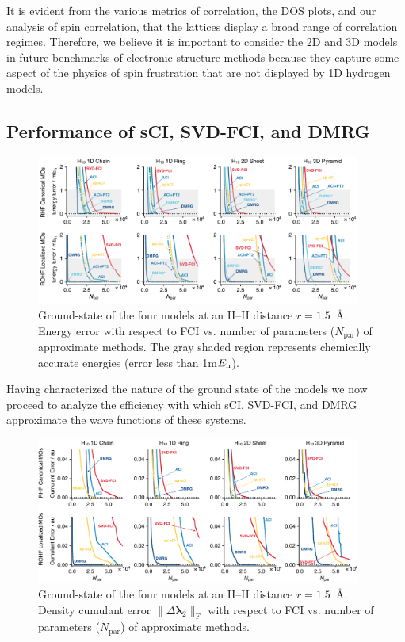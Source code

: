 \documentclass[aip,jcp,amsmath,amssymb, reprint]{revtex4-1}
\newcommand*{\Eh}{$E_{\rm h}$\xspace}
\providecommand{\norm}[1]{\lVert#1\rVert}
\begin{document}
It is evident from the various metrics of correlation, the DOS plots, and our analysis of spin correlation, that the  lattices display a broad range of correlation regimes.
Therefore, we believe it is important to consider the 2D and 3D models in future benchmarks of electronic structure methods because they capture some aspect of the physics of spin frustration that are not displayed by 1D hydrogen models.

\subsection{\label{H10compression} Performance of sCI, SVD-FCI, and DMRG}
\begin{figure}[ht]
\centering
\includegraphics[width=0.95\textwidth]{figure_4.pdf}
\caption{Ground-state of the four  models at an H--H distance $r = 1.5$~{\AA}. Energy error with respect to FCI vs. number of parameters ($N_\mathrm{par}$) of approximate methods. The gray shaded region represents chemically accurate energies (error less than 1m\Eh). }
\label{fig:h10compression_energy}
\end{figure}

Having characterized the nature of the ground state of the  models we now proceed to analyze the efficiency with which sCI, SVD-FCI, and DMRG approximate the wave functions of these systems. 

\begin{figure}[ht]
\centering
\includegraphics[width=0.95\textwidth]{figure_5.pdf}
\caption{Ground-state of the four  models at an H--H distance $r = 1.5$~{\AA}. Density cumulant error $ \norm{\Delta\pmb{\lambda}_{2}}_\mathrm{F}$ with respect to FCI vs. number of parameters ($N_\mathrm{par}$) of approximate methods.}
\label{fig:h10compression_cumulant}
\end{figure}
\end{document}
